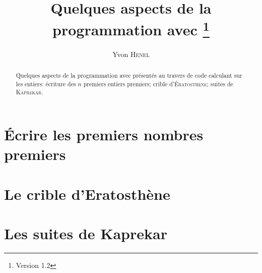 \documentclass[french]{article}
\title{%
  Quelques aspects de la programmation avec
  \Expliii{}\footnote{Version 1.2}}
\author{Yvon \textsc{Henel}}
\begin{document}





\makeunderlineletter
\DefineShortVerb{\|}
\maketitle{}

\begin{abstract}
  Quelques aspects de la programmation avec \Expliii{} présentés au
  travers de code calculant sur les entiers: écriture des \(n\)
  premiers entiers premiers; crible d'\textsc{Ératosthène}; suites de
  \textsc{Kaprekar}.
\end{abstract}

\vspace{4\baselineskip}

\begin{center}
\end{center}


\newpage{}

\tableofcontents{}

\newpage{}



\part{Écrire les premiers nombres premiers}
\label{part:premierspremiers}



\part{Le crible d'Eratosthène}
\label{part:cribleerato}



\part{Les suites de Kaprekar}
\label{part:kaprekar}
\end{document}
